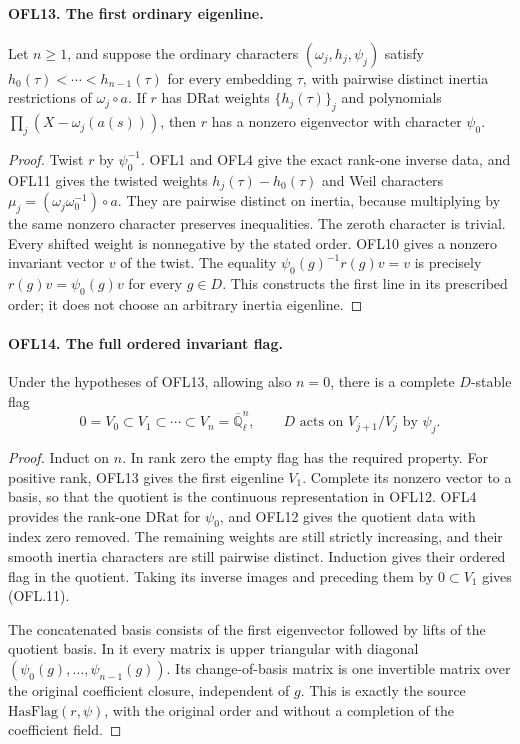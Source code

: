 \paragraph{OFL13. The first ordinary eigenline.}
\label{claim:OFL13}
Let \(n\ge1\), and suppose the ordinary characters
\((\omega_j,h_j,\psi_j)\) satisfy
\(h_0(\tau)<\cdots<h_{n-1}(\tau)\) for every embedding
\(\tau\), with pairwise distinct inertia restrictions of
\(\omega_j\circ a\).  If \(r\) has \(\mathrm{DRat}\)
weights \(\{h_j(\tau)\}_j\) and polynomials
\(\prod_j(X-\omega_j(a(s)))\), then \(r\) has a nonzero
eigenvector with character \(\psi_0\).
\begin{proof}
Twist \(r\) by \(\psi_0^{-1}\).  OFL1 and OFL4 give
the exact rank-one inverse data, and OFL11 gives the twisted
weights \(h_j(\tau)-h_0(\tau)\) and Weil characters
\(\mu_j=(\omega_j\omega_0^{-1})\circ a\).
They are pairwise distinct on inertia, because multiplying by the
same nonzero character preserves inequalities.  The zeroth
character is trivial.  Every shifted weight is nonnegative by
the stated order.  OFL10 gives a nonzero invariant vector \(v\)
of the twist.  The equality
\(\psi_0(g)^{-1}r(g)v=v\) is precisely
\(r(g)v=\psi_0(g)v\) for every \(g\in D\).
This constructs the first line in its prescribed order; it does
not choose an arbitrary inertia eigenline.
\end{proof}

\paragraph{OFL14. The full ordered invariant flag.}
\label{claim:OFL14}
Under the hypotheses of OFL13, allowing also \(n=0\), there is
a complete \(D\)-stable flag
\[
 0=V_0\subset V_1\subset\cdots\subset V_n
             =\overline{\mathbb Q}_\ell^n,
 \qquad D\text{ acts on }V_{j+1}/V_j\text{ by }\psi_j.
 \tag{OFL.11}
\]
\begin{proof}
Induct on \(n\).  In rank zero the empty flag has the required
property.  For positive rank, OFL13 gives the first eigenline
\(V_1\).  Complete its nonzero vector to a basis, so that the
quotient is the continuous representation in OFL12.  OFL4 provides
the rank-one \(\mathrm{DRat}\) for \(\psi_0\), and OFL12
gives the quotient data with index zero removed.  The remaining
weights are still strictly increasing, and their smooth inertia
characters are still pairwise distinct.  Induction gives their
ordered flag in the quotient.  Taking its inverse images and
preceding them by \(0\subset V_1\) gives (OFL.11).

The concatenated basis consists of the first eigenvector followed
by lifts of the quotient basis.  In it every matrix is upper
triangular with diagonal
\((\psi_0(g),\ldots,\psi_{n-1}(g))\).  Its change-of-basis
matrix is one invertible matrix over the original coefficient
closure, independent of \(g\).  This is exactly the source
\(\mathrm{HasFlag}(r,\psi)\), with the original order and
without a completion of the coefficient field.
\end{proof}

